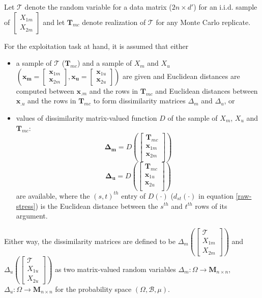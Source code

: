 \documentclass[11pt]{article} %
\begin{document}
Let $\mathcal{T}$ denote  the random variable for a data matrix ($2n\times d'$) for an  i.i.d. sample of  
$\left[ \begin{array}{c}
X_{1m}\\
X_{2m}
\end{array}
\right]$ and let  $\mathbf{T}_{mc}$  denote realization of $\mathcal{T}$ for any Monte Carlo replicate.


For the exploitation task at hand, it is assumed that either
\begin{itemize}
\item   a sample of $\mathcal{T}$ ($\mathbf{T}_{mc}$) and a sample of $X_m$ and  $X_u$ 
$\left(\bm{x_m}=\left[
 \begin{array}{c}
\bm{x}_{1m}\\
\bm{x}_{2m}
\end{array}
\right] ,\bm{x_u}=\left[
 \begin{array}{c}
 \bm{x}_{1u}\\
 \bm{x}_{2u} 
\end{array}
\right]\right)$ are given
 and  Euclidean distances are computed between  $\bm{x}_{.m}$ and the rows in  $\mathbf{T}_{mc}$  and Euclidean distances between  $\bm{x}_{.u}$ and the rows in  $\mathbf{T}_{mc}$ to form  dissimilarity matrices $\Delta_m$ and $\Delta_u$, or
\item  values of  dissimilarity matrix-valued function $D$ of  the sample of $X_m$, $X_u$ and $\mathbf{T}_{mc}$: $$
\mathbf{\Delta_m} = D \left( \left[
 \begin{array}{c}
\mathbf{T}_{mc}  \\
\bm{x}_{1m}\\
\bm{x}_{2m}\\
\end{array}
\right]
\right)
$$
$$
\mathbf{\Delta_u}=D \left( \left[
 \begin{array}{c}
\mathbf{T}_{mc}  \\
\bm{x}_{1u}\\
\bm{x}_{2u}\\
\end{array}
\right]
\right)
$$ are available,
where the  $(s,t)^{th}$ entry of $D(\cdot)$   ($d_{st}(\cdot)$ in equation \eqref{raw-stress})  is the Euclidean distance between the $s^{th}$ and $t^{th}$ rows of its argument.
\end{itemize}

Either way,  the dissimilarity matrices are defined to be $\Delta_{m} \left(\left[
\begin{array}{c}
\mathcal{T} \\
X_{1m} \\
X_{2m} 
\end {array}
\right]
\right)$  and 
 $\Delta_{u} \left(\left[
\begin{array}{c}
\mathcal{T}\\
X_{1u} \\
X_{2u}
\end {array}
\right]\right)$ as two matrix-valued random variables $\Delta_{m}:\Omega \rightarrow \mathbf{M}_{n\times n} $,$\Delta_{u}:\Omega \rightarrow \mathbf{M}_{n\times n} $  for the probability space $(\Omega,\mathcal{B},\mu)$.
\end{document}
